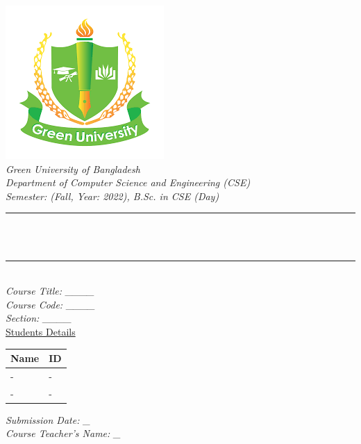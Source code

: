 \begin{titlepage}
\center 
\newcommand{\HRule}{\rule{\linewidth}{0.1mm}}
\includegraphics[scale=0.6]{Figures/GUB.png}\\[1cm] 
\center 
\textsl{\Large Green University of Bangladesh }\\[0.5cm] 
\textsl{\large Department of Computer Science and Engineering (CSE)}\\
\textsl{\large Semester: (Fall, Year: 2022), B.Sc. in CSE (Day)}\\[0.5cm] 
\makeatletter
\HRule \\[0.4cm]
{ \huge \bfseries \@title}\\[0.2cm] 
\HRule \\[1.0cm]

\textsl{\large Course Title: ____ }\\
\textsl{\large Course Code: ____ }\\ 
\textsl{\large Section: ____}\\[0.5cm] 

{\large \underline{Students Details}}\\[0.2cm]

\begin{table}[htb]
\centering
\begin{tabular}{ |P{7.0cm}|P{3.5cm}|}
\hline
\textbf{Name} & \textbf{ID}\\
\hline
-  & - \\
\hline
- & - \\
\hline
\end{tabular}
\end{table}
\vspace{0.5cm}


\textsl{\large Submission Date: \_ }\\ 
\textsl{\large Course Teacher’s Name: \_ }\\[0.9cm] 





\end{titlepage}
